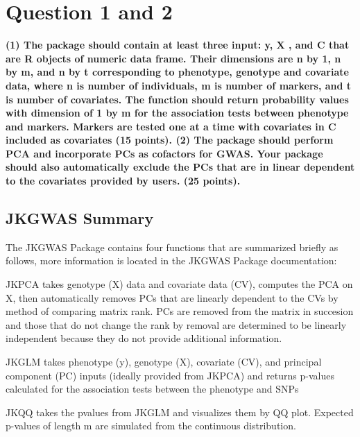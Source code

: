 \documentclass[
]{article}
\begin{document}
\hypertarget{question-1-and-2}{%
\section{Question 1 and 2}\label{question-1-and-2}}

\textbf{(1) The package should contain at least three input: y, X , and C that are R objects of numeric data frame. Their dimensions are n by 1, n by m, and n by t corresponding to phenotype, genotype and covariate data, where n is number of individuals, m is number of markers, and t is number of covariates. The function should return probability values with dimension of 1 by m for the association tests between phenotype and markers. Markers are tested one at a time with covariates in C included as covariates (15 points).
(2) The package should perform PCA and incorporate PCs as cofactors for GWAS.  Your package should also automatically exclude the PCs that are in linear dependent to the covariates provided by users. (25 points).}

\hypertarget{jkgwas-summary}{%
\subsection{JKGWAS Summary}\label{jkgwas-summary}}

The JKGWAS Package contains four functions that are summarized briefly
as follows, more information is located in the JKGWAS Package
documentation:

\par

\textbullet JKPCA takes genotype (X) data and covariate data (CV),
computes the PCA on X, then automatically removes PCs that are linearly
dependent to the CVs by method of comparing matrix rank. PCs are removed
from the matrix in succesion and those that do not change the rank by
removal are determined to be linearly independent because they do not
provide additional information.

\par

\textbullet JKGLM takes phenotype (y), genotype (X), covariate (CV), and
principal component (PC) inputs (ideally provided from JKPCA) and
returns p-values calculated for the association tests between the
phenotype and SNPs

\par

\textbullet JKQQ takes the pvalues from JKGLM and visualizes them by QQ
plot. Expected p-values of length m are simulated from the continuous
distribution.
\end{document}
